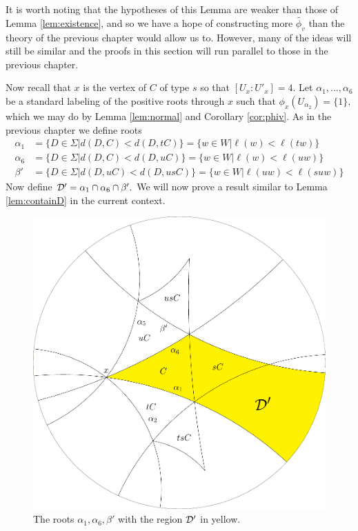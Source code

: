 \documentclass[class=book, crop=false]{standalone}
\begin{document}
It is worth noting that the hypotheses of this Lemma are weaker than those of Lemma \ref{lem:existence}, and so we have a hope of constructing more $\tilde{\phi_v}$ than the theory of the previous chapter would allow us to. However, many of the ideas will still be similar and the proofs in this section will run parallel to those in the previous chapter.

Now recall that $x$ is the vertex of $C$ of type $s$ so that $[U_x:U'_x]=4.$ Let $\alpha_1,\dots,\alpha_6$ be a standard labeling of the positive roots through $x$ such that $\phi_x(U_{\alpha_2})=\{1\},$ which we may do by Lemma \ref{lem:normal} and Corollary \ref{cor:phiv}. As in the previous chapter we define roots
	\begin{align*}
		\alpha_1&=\{D\in \Sigma|d(D,C)<d(D,tC)\}=\{w\in W|\ell(w)<\ell(tw)\}\\
		\alpha_6&=\{D\in \Sigma|d(D,C)<d(D,uC)\}=\{w\in W|\ell(w)<\ell(uw)\}\\
		\beta'&=\{D\in \Sigma|d(D,uC)<d(D,usC)\}=\{w\in W|\ell(uw)<\ell(suw)\}
	\end{align*}
	Now define $\mathcal{D}'=\alpha_1\cap \alpha_6\cap \beta'.$ We will now prove a result similar to Lemma \ref{lem:containD} in the current context.


	\begin{figure}
		\begin{center}
			\includegraphics[width=3.5 in]{diagrams/defineDprimenew.pdf}
		\end{center}
		\caption{The roots $\alpha_1,\alpha_6,\beta'$ with the region $\mathcal{D}'$ in yellow.}
		\label{fig:defineDprime}
	\end{figure}
\end{document}
